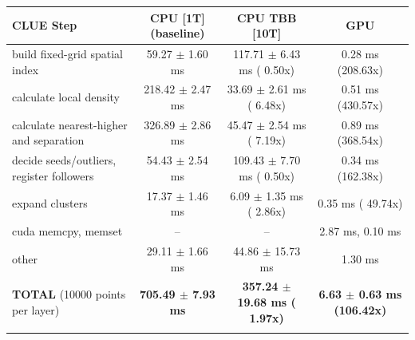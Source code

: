     \begin{tabular}{l|c|c|c}
    \hline
    CLUE Step                                 & CPU [1T] (baseline)         & CPU TBB [10T]                         & GPU                       \\ \hline
    build fixed-grid spatial index            &  59.27 $\pm$  1.60 ms       & 117.71 $\pm$  6.43 ms ( 0.50x)        &   0.28 ms (208.63x)       \\
    calculate local density                   & 218.42 $\pm$  2.47 ms       &  33.69 $\pm$  2.61 ms ( 6.48x)        &   0.51 ms (430.57x)       \\
    calculate nearest-higher and separation   & 326.89 $\pm$  2.86 ms       &  45.47 $\pm$  2.54 ms ( 7.19x)        &   0.89 ms (368.54x)       \\
    decide seeds/outliers, register followers &  54.43 $\pm$  2.54 ms       & 109.43 $\pm$  7.70 ms ( 0.50x)        &   0.34 ms (162.38x)       \\
    expand clusters                           &  17.37 $\pm$  1.46 ms       &   6.09 $\pm$  1.35 ms ( 2.86x)        &   0.35 ms ( 49.74x)       \\ \hline
    cuda memcpy, memset                       & --                          & --                                    &   2.87 ms,   0.10 ms      \\
    other                                     &  29.11 $\pm$  1.66 ms       &  44.86 $\pm$ 15.73 ms                 &   1.30 ms                 \\ \hline
    \textbf{TOTAL} (10000 points per layer)   & \textbf{705.49 $\pm$  7.93 ms} & \textbf{357.24 $\pm$ 19.68 ms ( 1.97x)} & \textbf{  6.63 $\pm$  0.63 ms (106.42x)}  \\
    \hline
    \multicolumn{4}{c}{}
    \end{tabular}
    \linebreak

